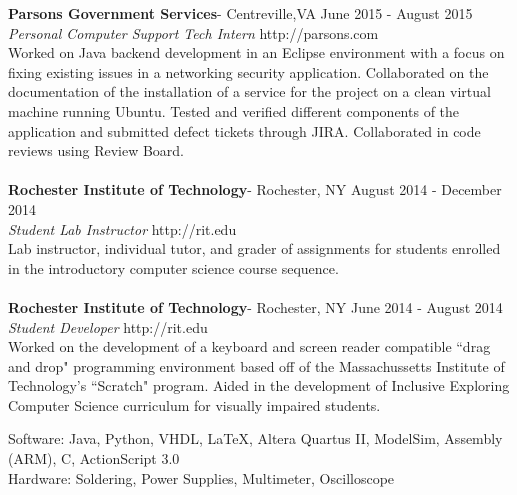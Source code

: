 \documentclass[9pt]{article} %
\begin{document}
{
\newline
	\textbf{Parsons Government Services}- Centreville,VA			\hfill June 2015 - August 2015
	\\ \textit{Personal Computer Support Tech Intern}	\hfill http://parsons.com
	\\ \indent Worked on Java backend development in an Eclipse environment with a focus on fixing existing issues in a networking security application.  Collaborated on the documentation of the installation of a service for the project on a clean virtual machine running Ubuntu.  Tested and verified different components of the application and submitted defect tickets through JIRA.  Collaborated in code reviews using Review Board.
	\\    
	\\	
	\textbf{Rochester Institute of Technology}- Rochester, NY 		\hfill August 2014 - December 2014
	\\ \textit{Student Lab Instructor}								\hfill http://rit.edu
	\\ \indent Lab instructor, individual tutor, and grader of assignments for students enrolled in the introductory computer science course sequence.   
	\\	
	\\ \textbf{Rochester Institute of Technology}- Rochester, NY 	\hfill June 2014 - August 2014
	\\ \textit{Student Developer}									\hfill http://rit.edu
	\\ \indent Worked on the development of a keyboard and screen reader compatible ``drag and drop" programming environment based off of the Massachussetts Institute of Technology's ``Scratch" program.  Aided in the development of Inclusive Exploring Computer Science curriculum for visually impaired students.


\bigskip


\newline
	Software: Java, Python, VHDL, \LaTeX, Altera Quartus II, ModelSim, Assembly (ARM), C, ActionScript 3.0 \\
	Hardware: Soldering, Power Supplies, Multimeter, Oscilloscope

}
\end{document}
